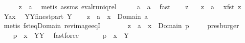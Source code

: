 \begin{isabellebody}
\ \ \isamarkupfalse%
\ \isamarkupfalse%
\ {\isachardoublequoteopen}z\ {\isasymin}\ a{\isachardoublequoteclose}\ \isamarkupfalse%
\ {\isacharparenleft}metis\ assms{\isacharparenleft}{}{\isacharparenright}\ eval{\isacharunderscore}runiq{\isacharunderscore}rel{\isacharparenright}\isanewline
\ \ \isacommand{{\isacharbraceright}}\isamarkupfalse%
\isanewline
{}\isamarkupfalse%
\ \isamarkupfalse%
\isanewline
{}{\isacharcolon}\ {\isachardoublequoteopen}{\isacharquery}a\ {\isasymsubseteq}\ a{\isachardoublequoteclose}\ \isamarkupfalse%
\ fast\isanewline
\isacommand{{\isacharbraceleft}}\isamarkupfalse%
\isanewline
\ \ \isamarkupfalse%
\ z\ \isamarkupfalse%
\ {}{\isacharcolon}\ {\isachardoublequoteopen}z\ {\isasymin}\ a{\isachardoublequoteclose}\ \isamarkupfalse%
\ {\isacharquery}x{\isacharequal}{\isachardoublequoteopen}fst\ z{\isachardoublequoteclose}\ \isamarkupfalse%
\ {\isacharquery}Y{\isacharequal}{\isachardoublequoteopen}a{\isacharcomma}{\isacharcomma}{\isacharquery}x{\isachardoublequoteclose}\ \isamarkupfalse%
\ {\isacharquery}YY{\isacharequal}{\isachardoublequoteopen}finestpart\ {\isacharquery}Y{\isachardoublequoteclose}\isanewline
\ \ \isamarkupfalse%
\ {\isachardoublequoteopen}z\ {\isasymin}\ a\ {\isacharampersand}\ {\isacharquery}x\ {\isasymin}\ Domain\ a{\isachardoublequoteclose}\ \isamarkupfalse%
\ {}\ \isamarkupfalse%
\ {\isacharparenleft}metis\ fst{\isacharunderscore}eq{\isacharunderscore}Domain\ rev{\isacharunderscore}image{\isacharunderscore}eqI{\isacharparenright}\ \isamarkupfalse%
\isanewline
\ \ \isamarkupfalse%
\ \isanewline
\ \ {}{\isacharcolon}{\isachardoublequoteopen}z\ {\isasymin}\ a\ {\isacharampersand}\ {\isacharquery}x\ {\isasymin}\ Domain\ {\isacharquery}p{\isachardoublequoteclose}\ \isamarkupfalse%
\ {}\ \isamarkupfalse%
\ presburger\ \ \isamarkupfalse%
\isanewline
\ \ \isamarkupfalse%
\ {\isachardoublequoteopen}{\isacharquery}p\ {\isacharbackquote}{\isacharbackquote}\ {\isacharbraceleft}{\isacharquery}x{\isacharbraceright}\ {\isacharequal}\ {\isacharquery}YY{\isachardoublequoteclose}\ \isamarkupfalse%
\ fastforce\isanewline
\ \ \isamarkupfalse%
\ \isamarkupfalse%
\ {\isachardoublequoteopen}{\isasymUnion}\ {\isacharparenleft}{\isacharquery}p\ {\isacharbackquote}{\isacharbackquote}\ {\isacharbraceleft}{\isacharquery}x{\isacharbraceright}{\isacharparenright}\ {\isacharequal}\ {\isacharquery}Y{\isachardoublequoteclose}\ \isamarkupfalse%

\end{isabellebody}
